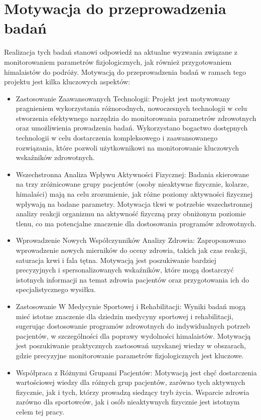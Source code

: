 \section{Motywacja do przeprowadzenia badań}
Realizacja tych badań stanowi odpowiedź na aktualne wyzwania związane z monitorowaniem parametrów fizjologicznych, jak również przygotowaniem himalaistów do podróży. Motywacją do przeprowadzenia badań w ramach tego projektu jest kilka kluczowych aspektów:
\begin{itemize}
    \item Zastosowanie Zaawansowanych Technologii: Projekt jest motywowany pragnieniem wykorzystania różnorodnych, nowoczesnych technologii w celu stworzenia efektywnego narzędzia do monitorowania parametrów zdrowotnych oraz umożliwienia prowadzenia badań. Wykorzystano bogactwo dostępnych technologii w celu dostarczenia kompleksowego i zaawansowanego rozwiązania, które pozwoli użytkownikowi na monitorowanie kluczowych wskaźników zdrowotnych.
    \item Wszechstronna Analiza Wpływu Aktywności Fizycznej: Badania skierowane na trzy zróżnicowane grupy pacjentów (osoby nieaktywne fizycznie, kolarze, himalaści) mają na celu zrozumienie, jak różne poziomy aktywności fizycznej wpływają na badane parametry. Motywacja tkwi w potrzebie wszechstronnej analizy reakcji organizmu na aktywność fizyczną przy obniżonym poziomie tlenu, co ma potencjalne znaczenie dla dostosowania programów zdrowotnych.
    \item Wprowadzenie Nowych Współczynników Analizy Zdrowia: Zaproponowano wprowadzenie nowych mierników do oceny zdrowia, takich jak czas reakcji, saturacja krwi i fala tętna. Motywacją jest poszukiwanie bardziej precyzyjnych i spersonalizowanych wskaźników, które mogą dostarczyć istotnych informacji na temat zdrowia pacjentów oraz przygotowania ich do specjalistycznego wysiłku.
    \item Zastosowanie W Medycynie Sportowej i Rehabilitacji: Wyniki badań mogą mieć istotne znaczenie dla dziedzin medycyny sportowej i rehabilitacji, sugerując dostosowanie programów zdrowotnych do indywidualnych potrzeb pacjentów, w szczególności dla poprawy wydolności himalaistów. Motywacją jest poszukiwanie praktycznych zastosowań uzyskanej wiedzy w obszarach, gdzie precyzyjne monitorowanie parametrów fizjologicznych jest kluczowe.
    \item Współpraca z Różnymi Grupami Pacjentów: Motywacją jest chęć dostarczenia wartościowej wiedzy dla różnych grup pacjentów, zarówno tych aktywnych fizycznie, jak i tych, którzy prowadzą siedzący tryb życia. Wsparcie zdrowia zarówno dla sportowców, jak i osób nieaktywnych fizycznie jest istotnym celem tej pracy.
\end{itemize}

